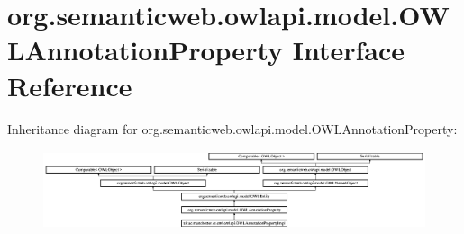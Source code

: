 \hypertarget{interfaceorg_1_1semanticweb_1_1owlapi_1_1model_1_1_o_w_l_annotation_property}{\section{org.\-semanticweb.\-owlapi.\-model.\-O\-W\-L\-Annotation\-Property Interface Reference}
\label{interfaceorg_1_1semanticweb_1_1owlapi_1_1model_1_1_o_w_l_annotation_property}
}
Inheritance diagram for org.\-semanticweb.\-owlapi.\-model.\-O\-W\-L\-Annotation\-Property\-:\begin{figure}[H]
\begin{center}
\leavevmode
\includegraphics[height=2.314050cm]{interfaceorg_1_1semanticweb_1_1owlapi_1_1model_1_1_o_w_l_annotation_property}
\end{center}
\end{figure}
